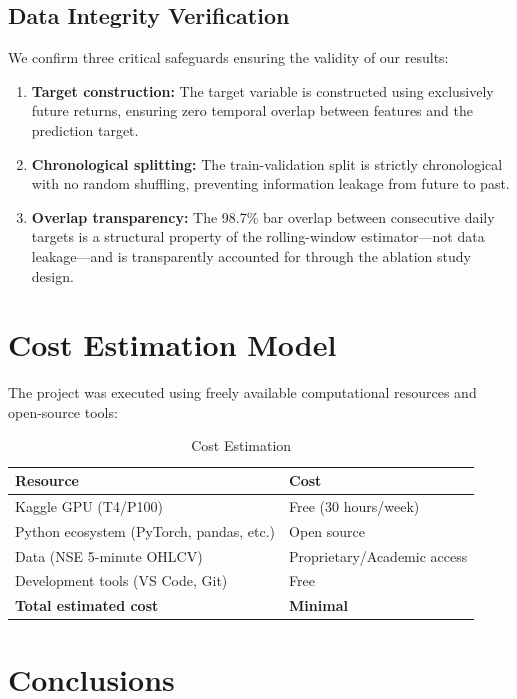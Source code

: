 \subsection{Data Integrity Verification}

We confirm three critical safeguards ensuring the validity of our results:
\begin{enumerate}
    \item \textbf{Target construction:} The target variable is constructed using exclusively future returns, ensuring zero temporal overlap between features and the prediction target.
    \item \textbf{Chronological splitting:} The train-validation split is strictly chronological with no random shuffling, preventing information leakage from future to past.
    \item \textbf{Overlap transparency:} The 98.7\% bar overlap between consecutive daily targets is a structural property of the rolling-window estimator---not data leakage---and is transparently accounted for through the ablation study design.
\end{enumerate}

\section{Cost Estimation Model}

The project was executed using freely available computational resources and open-source tools:

\begin{table}[h!]
\caption{Cost Estimation}
\centering
\begin{tabular}{ll}
\hline
\textbf{Resource} & \textbf{Cost} \\
\hline
Kaggle GPU (T4/P100) & Free (30 hours/week) \\
Python ecosystem (PyTorch, pandas, etc.) & Open source \\
Data (NSE 5-minute OHLCV) & Proprietary/Academic access \\
Development tools (VS Code, Git) & Free \\
\hline
\textbf{Total estimated cost} & \textbf{Minimal} \\
\hline
\end{tabular}
\end{table}

\pagebreak
\section{Conclusions}

